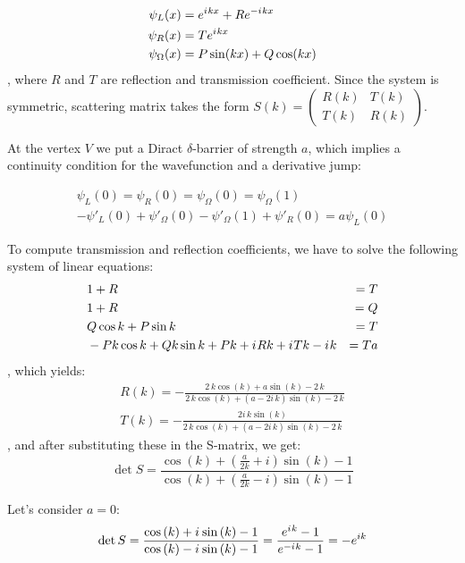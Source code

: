 \documentclass{birkjour}
\theoremstyle{definition}
\theoremstyle{remark}
\numberwithin{equation}{section}
\newcommand{\eexp}[1]{e^{#1}}
\newcommand{\iu}{{i\mkern1mu}}
\begin{document}
\begin{align*}
\psi_L(x) &= \eexp{\iu k x} + R \eexp{-\iu k x} \\
\psi_R(x) &= T \eexp{\iu k x}\\
\psi_\Omega(x) &= P \sin(k x) + Q \cos(k x)
\end{align*}
, where $R$ and $T$ are reflection and transmission coefficient. Since the system is symmetric, scattering matrix takes the form
$S(k) = \begin{pmatrix} R(k) & T(k) \\ T(k) & R(k) \end{pmatrix}$.

At the vertex $V$ we put a Diract $\delta$-barrier of strength $a$, which implies a continuity condition for the wavefunction and a derivative jump:

\begin{align*}
\psi_L(0) = \psi_R(0) = \psi_\Omega(0) = \psi_\Omega(1) \\ 
-\psi'_L(0) + \psi'_\Omega(0) - \psi'_\Omega(1) + \psi'_R(0) = a \psi_L(0)
\end{align*}


To compute transmission and reflection coefficients, we have to solve the following system of linear equations:
\begin{align*}
& 1 + R &= T \\
& 1 + R &= Q \\
& Q \cos k + P \sin k &= T \\
& -P k \cos k + Q k \sin k + P k + \iu R k + \iu T k - \iu k &= T a
\end{align*}
, which yields:
\begin{align*}
R(k) = -\frac{2 \, k \cos\left(k\right) + a \sin\left(k\right) - 2 \, k}{2 \, k \cos\left(k\right) + {\left(a - 2 i \, k\right)} \sin\left(k\right) - 2 \, k} \\
T(k) = -\frac{2 i \, k \sin\left(k\right)}{2 \, k \cos\left(k\right) + {\left(a - 2 i \, k\right)} \sin\left(k\right) - 2 \, k}
\end{align*}
, and after substituting these in the S-matrix, we get:
\[
\det S = 
\frac
{\cos\left(k\right) + {\left(\frac{a}{2 k} + i\right)} \sin\left(k\right) - 1}
{\cos\left(k\right) + {\left(\frac{a}{2 k} - i\right)} \sin\left(k\right) - 1}
\]


Let's consider $a=0$:
\[
\det S
= \frac
{\cos\left(k\right) + \iu \sin\left(k\right) - 1}
{\cos\left(k\right) - \iu \sin\left(k\right) - 1}
= \frac{\eexp{\iu k} - 1}{\eexp{-\iu k} - 1}
= -\eexp{i k}
\]
\end{document}
